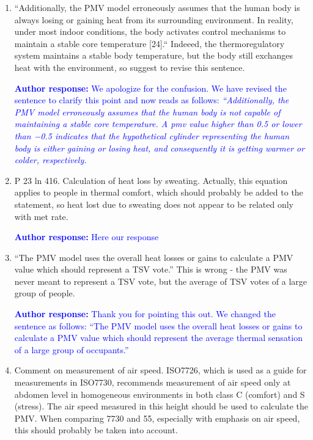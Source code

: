 \documentclass[a4paper, 10pt]{letter}
\newcommand{\response}[1]{\textcolor{blue}{\textbf{Author response:} #1}}
\begin{document}
\begin{letter}
\begin{enumerate}
            \response{Here our response}

            \item ``Additionally, the PMV model erroneously assumes that the human body is always losing or gaining heat from its surrounding environment.
            In reality, under most indoor conditions, the body activates control mechanisms to maintain a stable core temperature [24].``
            Indeeed, the thermoregulatory system maintains a stable body temperature, but the body still exchanges heat with the environment, so suggest to revise this sentence.

            \response{
                We apologize for the confusion.
                We have revised the sentence to clarify this point and now reads as follows: \textit{``Additionally, the PMV model erroneously assumes that the human body is not capable of maintaining a stable core temperature.
                A \ac{pmv} value higher than \num{.5} or lower than \num{-.5} indicates that the hypothetical cylinder representing the human body is either gaining or losing heat, and consequently it is getting warmer or colder, respectively.
                }
            }

            \item P 23 ln 416.
            Calculation of heat loss by sweating.
            Actually, this equation applies to people in thermal comfort, which should probably be added to the statement, so heat lost due to sweating does not appear to be related only with met rate.

            \response{Here our response}

            \item ``The PMV model uses the overall heat losses or gains to calculate a PMV value which should represent a TSV vote.'' This is wrong - the PMV was never meant to represent a TSV vote, but the average of TSV votes of a large group of people.

            \response{
                Thank you for pointing this out.
                We changed the sentence as follows: ``The PMV model uses the overall heat losses or gains to calculate a PMV value which should represent the average thermal sensation of a large group of occupants.''
            }

            \item Comment on measurement of air speed.
            ISO7726, which is used as a guide for measurements in ISO7730, recommends measurement of air speed only at abdomen level in homogeneous environments in both class C (comfort) and S (stress).
            The air speed measured in this height should be used to calculate the PMV\@.
            When comparing 7730 and 55, especially with emphasis on air speed, this should probably be taken into account.


\end{enumerate}
\end{letter}
\end{document}
